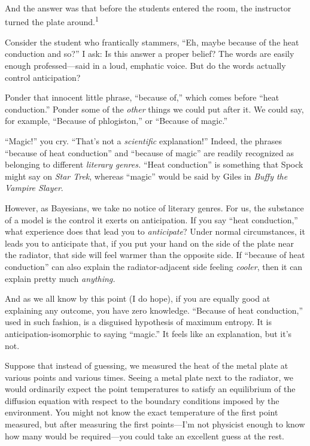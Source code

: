 {
 And the answer was that before the students entered the room, the
instructor turned the plate around.\textsuperscript{1}}

{
 Consider the student who frantically stammers,
``Eh, maybe because of the heat conduction and
so?'' I ask: Is this answer a proper belief? The
words are easily enough professed---said in a loud, emphatic voice. But
do the words actually control anticipation?}

{
 Ponder that innocent little phrase, ``because
of,'' which comes before ``heat
conduction.'' Ponder some of the \textit{other}
things we could put after it. We could say, for example,
``Because of phlogiston,'' or
``Because of magic.''}

{
 ``Magic!'' you cry.
``That's not a \textit{scientific}
explanation!'' Indeed, the phrases
``because of heat conduction'' and
``because of magic'' are readily
recognized as belonging to different \textit{literary genres.}
``Heat conduction'' is something
that Spock might say on \textit{Star Trek}, whereas
``magic'' would be said by Giles in
\textit{Buffy the Vampire Slayer}.}

{
 However, as Bayesians, we take no notice of literary genres. For
us, the substance of a model is the control it exerts on anticipation.
If you say ``heat conduction,'' what
experience does that lead you to \textit{anticipate}? Under normal
circumstances, it leads you to anticipate that, if you put your hand on
the side of the plate near the radiator, that side will feel warmer
than the opposite side. If ``because of heat
conduction'' can also explain the radiator-adjacent
side feeling \textit{cooler}, then it can explain pretty much
\textit{anything.}}

{
 And as we all know by this point (I do hope), if you are equally
good at explaining any outcome, you have zero knowledge.
``Because of heat conduction,'' used
in such fashion, is a disguised hypothesis of maximum entropy. It is
anticipation-isomorphic to saying
``magic.'' It feels like an
explanation, but it's not.}

{
 Suppose that instead of guessing, we measured the heat of the
metal plate at various points and various times. Seeing a metal plate
next to the radiator, we would ordinarily expect the point temperatures
to satisfy an equilibrium of the diffusion equation with respect to the
boundary conditions imposed by the environment. You might not know the
exact temperature of the first point measured, but after measuring the
first points---I'm not physicist enough to know how
many would be required---you could take an excellent guess at the
rest.}


